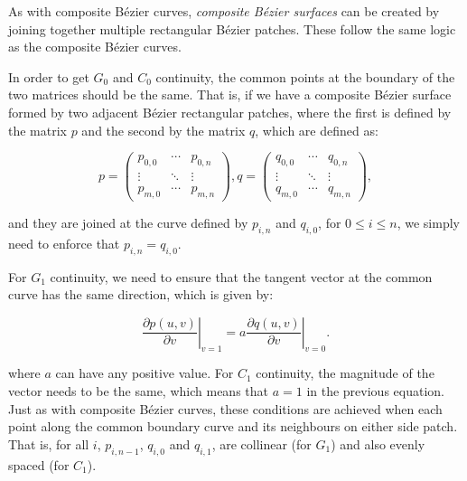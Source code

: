 As with composite B\'ezier curves, \emph{composite B\'ezier surfaces} can be created by joining together multiple rectangular B\'ezier patches.
These follow the same logic as the composite B\'ezier curves.

In order to get \(G_0\) and \(C_0\) continuity, the common points at the boundary of the two matrices should be the same.
That is, if we have a composite B\'ezier surface formed by two adjacent B\'ezier rectangular patches, where the first is defined by the matrix \(p\) and the second by the matrix \(q\), which are defined as:

\begin{equation}
p = \left(\begin{array}{ccc}
p_{0,0} & \cdots & p_{0,n} \\
\vdots & \ddots & \vdots \\
p_{m,0} & \cdots & p_{m,n} 
\end{array}\right),
q = \left(\begin{array}{ccc}
q_{0,0} & \cdots & q_{0,n} \\
\vdots & \ddots & \vdots \\
q_{m,0} & \cdots & q_{m,n} 
\end{array}\right),
\end{equation}

and they are joined at the curve defined by \(p_{i,n}\) and \(q_{i,0}\), for \(0 \leq i \leq n\), we simply need to enforce that \(p_{i,n} = q_{i, 0}\).

For \(G_1\) continuity, we need to ensure that the tangent vector at the common curve has the same direction, which is given by:

\begin{equation}
\left. \frac{\partial p(u,v)}{\partial v} \right|_{v=1} = a \left. \frac{\partial q(u,v)}{\partial v} \right|_{v=0}.
\end{equation}

where \(a\) can have any positive value.
For \(C_1\) continuity, the magnitude of the vector needs to be the same, which means that \(a = 1\) in the previous equation.
Just as with composite B\'ezier curves, these conditions are achieved when each point along the common boundary curve and its neighbours on either side patch.
That is, for all \(i\), \(p_{i, n-1}\), \(q_{i, 0}\) and \(q_{i, 1}\), are collinear (for \(G_1\)) and also evenly spaced (for \(C_1\)). 

